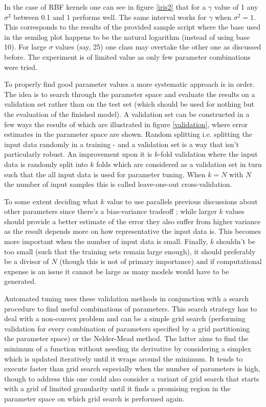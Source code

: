 \par\noindent  In the case of RBF kernels one can see in figure \ref{iris2} that for a $\gamma$ value of 1 any $\sigma^2$ between 0.1 and 1 performs well. The same interval works for $\gamma$ when $\sigma^2=1$. This corresponds to the results of the provided sample script where the base used in the semilog plot happens to be the natural logarithm (instead of using base 10). For large $\sigma$ values (say, 25) one class may overtake the other one as discussed before. The experiment is of limited value as only few parameter combinations were tried.

\par\noindent To properly find good parameter values a more systematic approach is in order. The idea is to search through the parameter space and evaluate the results on a validation set rather than on the test set (which should be used for nothing but the evaluation of the finished model). A validation set can be constructed in a few ways the results of which are illustrated in figure \ref{validation}, where error estimates in the parameter space are shown. Random splitting i.e. splitting the input data randomly in a training - and a validation set is a way that isn't particularly robust. An improvement upon it is $k$-fold validation where the input data is randomly split into $k$ folds which are considered as a validation set in turn such that the all input data is used for parameter tuning. When $k=N$ with $N$ the number of input samples this is called leave-one-out cross-validation. 

\endgroup

\par To some extent deciding what $k$ value to use parallels previous discussions about other parameters since there's a bias-variance tradeoff ; while larger $k$ values should provide a better estimate of the error they also suffer from higher variance as the result depends more on how representative the input data is. This becomes more important when the number of input data is small. Finally, $k$ shouldn't be too small (such that the training sets remain large enough), it should preferably be a divisor of $N$ (though this is not of primary importance) and if computational expense is an issue it cannot be large as many models would have to be generated.

\par Automated tuning uses these validation methods in conjunction with a search procedure to find useful combinations of parameters. This search strategy has to deal with a non-convex problem and can be a simple grid search (performing validation for every combination of parameters specified by a grid partitioning the parameter space) or the Nelder-Mead method. The latter aims to find the minimum of a function without needing its derivative by considering a simplex which is updated iteratively until it wraps around the minimum. It tends to execute faster than grid search especially when the number of parameters is high, though to address this one could also consider a variant of grid search that starts with a grid of limited granularity until it finds a promising region in the parameter space on which grid search is performed again.

